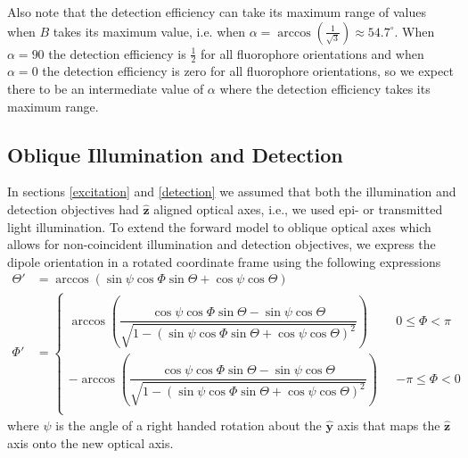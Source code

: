 \documentclass[10pt]{article}
\providecommand{\mh}[1]{\mathbf{\hat{#1}}}
\begin{document}
Also note that the detection efficiency can take its maximum range of values
when $B$ takes its maximum value, i.e. when
$\alpha=\arccos\left(\frac{1}{\sqrt{3}}\right) \approx 54.7^{\circ}$. When
$\alpha = 90$ the detection efficiency is $\frac{1}{2}$ for all fluorophore
orientations and when $\alpha = 0$ the detection efficiency is zero for all
fluorophore orientations, so we expect there to be an intermediate value of
$\alpha$ where the detection efficiency takes its maximum range.

\subsection{Oblique Illumination and Detection}\label{oblique}
In sections \ref{excitation} and \ref{detection} we assumed that both the
illumination and detection objectives had $\mh{z}$ aligned optical axes, i.e.,
we used epi- or transmitted light illumination. To extend the forward model to
oblique optical axes which allows for non-coincident illumination and detection
objectives, we express the dipole orientation in a rotated coordinate frame
using the following expressions
\begin{align}
    \Theta' &= \arccos\left(\sin\psi\cos\Phi\sin\Theta + \cos\psi\cos\Theta\right)\label{eq:thetap}\\
  \Phi' &=
          \begin{cases}
            \arccos\left(\dfrac{\cos\psi\cos\Phi\sin\Theta - \sin\psi\cos\Theta}{\sqrt{1 - (\sin\psi\cos\Phi\sin\Theta + \cos\psi\cos\Theta)^2}}\right) \ \ \ &0 \leq \Phi < \pi  \\
            -\arccos\left(\dfrac{\cos\psi\cos\Phi\sin\Theta - \sin\psi\cos\Theta}{\sqrt{1 - (\sin\psi\cos\Phi\sin\Theta + \cos\psi\cos\Theta)^2}}\right) \ \ \ &-\pi \leq \Phi < 0\\
          \end{cases}\label{eq:phip}
\end{align}
where $\psi$ is the angle of a right handed rotation about the $\mh{y}$ axis
that maps the $\mh{z}$ axis onto the new optical axis.
\end{document}
